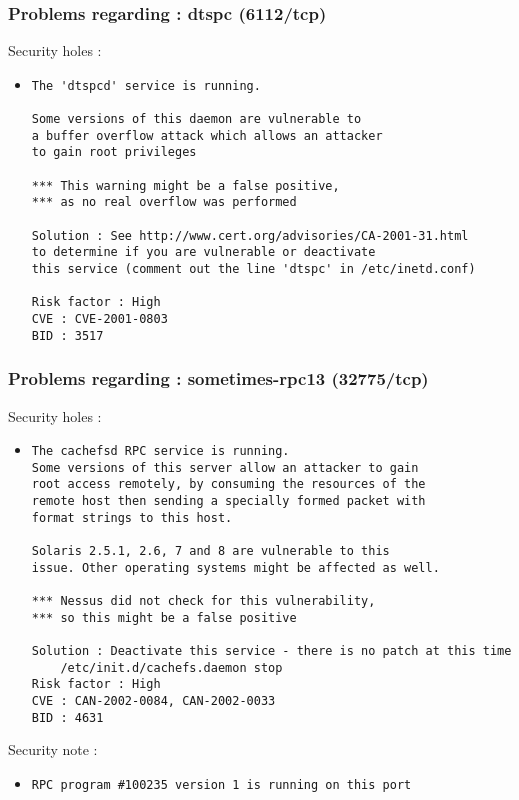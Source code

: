 \documentclass{article}
\begin{document}
\subsubsection{Problems regarding : dtspc (6112/tcp)}
Security holes :\\
\begin{itemize}
\item \begin{verbatim}
The 'dtspcd' service is running.

Some versions of this daemon are vulnerable to
a buffer overflow attack which allows an attacker
to gain root privileges

*** This warning might be a false positive,
*** as no real overflow was performed

Solution : See http://www.cert.org/advisories/CA-2001-31.html
to determine if you are vulnerable or deactivate
this service (comment out the line 'dtspc' in /etc/inetd.conf)

Risk factor : High
CVE : CVE-2001-0803
BID : 3517
\end{verbatim}\end{itemize}
\subsubsection{Problems regarding : sometimes-rpc13 (32775/tcp)}
Security holes :\\
\begin{itemize}
\item \begin{verbatim}
The cachefsd RPC service is running. 
Some versions of this server allow an attacker to gain
root access remotely, by consuming the resources of the 
remote host then sending a specially formed packet with
format strings to this host.

Solaris 2.5.1, 2.6, 7 and 8 are vulnerable to this
issue. Other operating systems might be affected as well.

*** Nessus did not check for this vulnerability, 
*** so this might be a false positive

Solution : Deactivate this service - there is no patch at this time
    /etc/init.d/cachefs.daemon stop
Risk factor : High
CVE : CAN-2002-0084, CAN-2002-0033
BID : 4631
\end{verbatim}\end{itemize}
Security note :\\
\begin{itemize}
\item \begin{verbatim}
RPC program #100235 version 1 is running on this port
\end{verbatim}\end{itemize}
\end{document}
